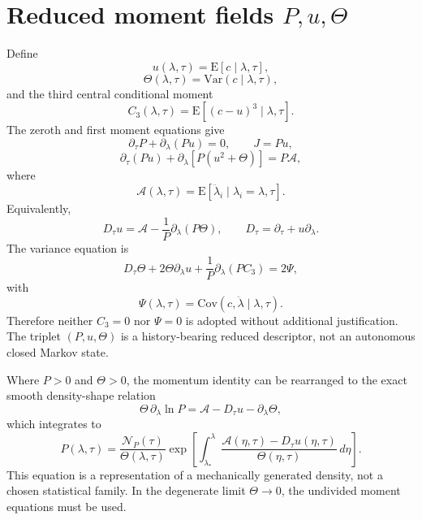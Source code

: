 \documentclass[11pt]{article}
\newcommand{\E}{\mathrm{E}}
\newcommand{\Var}{\mathrm{Var}}
\newcommand{\Cov}{\mathrm{Cov}}
\begin{document}
\section{Reduced moment fields \texorpdfstring{\(P,u,\Theta\)}{P,u,Theta}}
Define
\begin{equation}
u(\lambda,\tau)=\E[c\mid\lambda,\tau],
\end{equation}
\begin{equation}
\Theta(\lambda,\tau)=\Var(c\mid\lambda,\tau),
\end{equation}
and the third central conditional moment
\begin{equation}
C_3(\lambda,\tau)=\E[(c-u)^3\mid\lambda,\tau].
\end{equation}
The zeroth and first moment equations give
\begin{equation}
\partial_\tau P+\partial_\lambda(Pu)=0,
\qquad J=Pu,
\label{eq:continuity}
\end{equation}
\begin{equation}
\partial_\tau(Pu)+\partial_\lambda\left[P(u^2+\Theta)\right]=P\mathcal A,
\end{equation}
where
\begin{equation}
\mathcal A(\lambda,\tau)=\E[\ddot\lambda_i\mid\lambda_i=\lambda,\tau].
\end{equation}
Equivalently,
\begin{equation}
D_\tau u
=\mathcal A-\frac1P\partial_\lambda(P\Theta),
\qquad
D_\tau=\partial_\tau+u\partial_\lambda.
\end{equation}
The variance equation is
\begin{equation}
D_\tau\Theta
+2\Theta\partial_\lambda u
+\frac1P\partial_\lambda(PC_3)=2\Psi,
\label{eq:theta}
\end{equation}
with
\begin{equation}
\Psi(\lambda,\tau)=\Cov(c,\ddot\lambda\mid\lambda,\tau).
\end{equation}
Therefore neither \(C_3=0\) nor \(\Psi=0\) is adopted without additional justification. The triplet \((P,u,\Theta)\) is a history-bearing reduced descriptor, not an autonomous closed Markov state.

Where \(P>0\) and \(\Theta>0\), the momentum identity can be rearranged to the exact smooth density-shape relation
\begin{equation}
\Theta\,\partial_\lambda\ln P
=\mathcal A-D_\tau u-\partial_\lambda\Theta,
\end{equation}
which integrates to
\begin{equation}
P(\lambda,\tau)
=\frac{\mathcal N_P(\tau)}{\Theta(\lambda,\tau)}
\exp\left[
\int_{\lambda_*}^{\lambda}
\frac{\mathcal A(\eta,\tau)-D_\tau u(\eta,\tau)}{\Theta(\eta,\tau)}\,d\eta
\right].
\label{eq:pshape}
\end{equation}
This equation is a representation of a mechanically generated density, not a chosen statistical family. In the degenerate limit \(\Theta\to0\), the undivided moment equations must be used.
\end{document}
